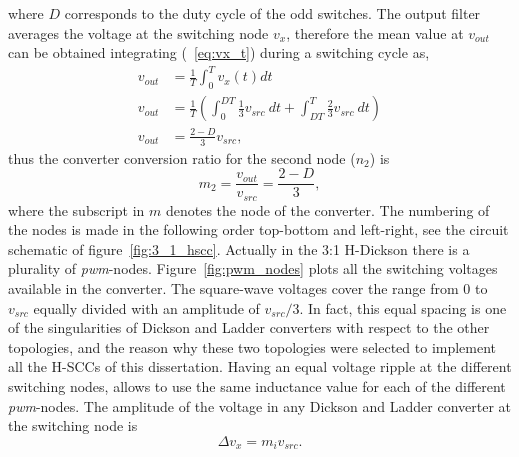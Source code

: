 where $D$ corresponds to the duty cycle of the odd switches. The output filter averages the voltage at the switching node $v_x$, therefore the mean value at $v_{out}$ can be obtained integrating (~\ref{eq:vx_t}) during a switching cycle as,
\begin{align}
 v_{out} & = \frac{1}{T} \int_{0}^{T}  v_x(t) dt \\[3ex]
 v_{out} & = \frac{1}{T} \left( \int_{0}^{DT} \frac{1}{3} v_{src} ~dt + \int_{DT}^{T} \frac{2}{3} v_{src} ~dt \right) \\[3ex]
 v_{out} & = \frac{2-D}{3} v_{src},
 \label{eq:int_vx_t}
\end{align}
thus the converter conversion ratio for the second node ($n_2$) is
\begin{equation}
 m_2   = \frac{v_{out}}{v_{src}} = \frac{2-D}{3},
 \label{eq:int_vx_t}
\end{equation}
where the subscript in $m$ denotes the node of the converter. The numbering of the nodes is made in the following order top-bottom and left-right, see the circuit schematic of figure~\ref{fig:3_1_hscc}. Actually in the 3:1 H-Dickson there is a plurality of \emph{pwm}-nodes. Figure~\ref{fig:pwm_nodes} plots all the switching voltages available in the converter. The square-wave voltages cover the range from 0 to $v_{src}$ equally divided with an amplitude of $v_{src}/3$. In fact, this equal spacing is one of the singularities of Dickson and Ladder converters with respect to the other topologies, and the reason why these two topologies were selected to implement all the H-SCCs of this dissertation. Having an equal voltage ripple at the different switching nodes, allows to use the same inductance value for each of the different \emph{pwm}-nodes. The amplitude of the voltage in any Dickson and Ladder converter at the switching node is
\begin{equation}
\Delta v_x = m_i v_{src}.
\label{eq:del_vx}
\end{equation}

